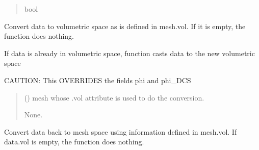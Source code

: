 \documentclass[letterpaper,10pt,english]{sphinxmanual}
\begin{document}
\begin{fulllineitems}
\begin{fulllineitems}
\begin{quote}
\begin{description}
\sphinxAtStartPar
bool

\end{description}\end{quote}

\end{fulllineitems}


\begin{fulllineitems}
\label{\detokenize{_autosummary/nirfasterff.base.data.DCSdata:nirfasterff.base.data.DCSdata.togrid}}
\pysigstartsignatures
\pysiglinewithargsret
{}
{}
{}
\pysigstopsignatures
\sphinxAtStartPar
Convert data to volumetric space as is defined in mesh.vol. If it is empty, the function does nothing.

\sphinxAtStartPar
If data is already in volumetric space, function casts data to the new volumetric space

\sphinxAtStartPar
CAUTION: This OVERRIDES the fields phi and phi\_DCS
\begin{quote}\begin{description}
\sphinxAtStartPar
{} () \textendash{} mesh whose .vol attribute is used to do the conversion.

\sphinxAtStartPar
None.

\end{description}\end{quote}

\end{fulllineitems}


\begin{fulllineitems}
\label{\detokenize{_autosummary/nirfasterff.base.data.DCSdata:nirfasterff.base.data.DCSdata.tomesh}}
\pysigstartsignatures
\pysiglinewithargsret
{}
{}
{}
\pysigstopsignatures
\sphinxAtStartPar
Convert data back to mesh space using information defined in mesh.vol. If data.vol is empty, the function does nothing.


\end{fulllineitems}
\end{fulllineitems}
\end{document}
